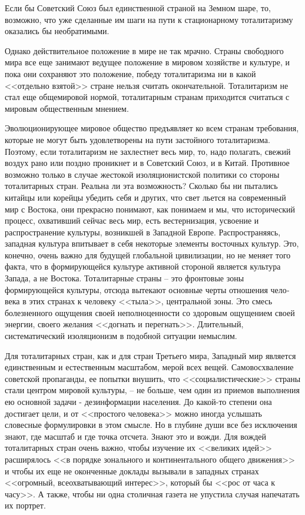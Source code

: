 \documentclass{book}
\begin{document}
Если бы Советский Союз был единственной страной на Земном шаре, то, возможно, что уже сделанные им шаги на пути к стационарному тоталитаризму оказались бы необратимыми.

Однако действительное положение в мире не так мрачно. Страны свободного мира все еще занимают ведущее положение в мировом хозяйстве и культуре, и пока они сохраняют это поло­жение, победу тоталитаризма ни в какой <<отдельно взятой>> стране нельзя считать окончательной. Тоталитаризм не стал еще общемировой нормой, тоталитарным странам приходится считаться с мировым общественным мнением.

Эволюционирующее мировое общество предъявляет ко всем странам требования, которые не могут быть удовлетво­рены на пути застойного тоталитаризма. Поэтому, если тотали­таризм не захлестнет весь мир, то, надо полагать, свежий воз­дух рано или поздно проникнет и в Советский Союз, и в Ки­тай. Противное возможно только в случае жестокой изоляци­онистской политики со стороны тоталитарных стран. Реальна ли эта возможность? Сколько бы ни пытались китайцы или ко­рейцы убедить себя и других, что свет льется на современный мир с Востока, они прекрасно понимают, как понимаем и мы, что исторический процесс, охвативший сейчас весь мир, есть вестернизация,  усвоение и распространение культуры, возник­шей в Западной Европе. Распространяясь, западная культура впитывает в себя некоторые элементы восточных культур. Это, конечно, очень важно для будущей глобальной цивили­зации, но не меняет того факта, что в формирующейся культу­ре активной стороной является культура Запада, а не Востока. Тоталитарные страны -- это фронтовые 
зоны формирующейся культуры, отсюда вытекают основные черты отношения чело­века в этих странах к человеку <<тыла>>, центральной зоны. Это смесь болезненного ощущения своей неполноценности со здо­ровым ощущением своей энергии, своего желания <<догнать и перегнать>>. Длительный, систематический изоляционизм в по­добной ситуации немыслим.

Для тоталитарных стран, как и для стран Третьего мира, Западный мир является единственным и естественным масшта­бом, мерой всех вещей. Самовосхваление советской пропаган­ды, ее попытки внушить, что <<социалистические>> страны ста­ли центром мировой культуры, -- не больше, чем один из при­емов выполнения ею основной задачи - дезинформации насе­ления. До какой-то степени она достигает цели, и от <<простого человека>> можно иногда услышать словесные формулировки в этом смысле. Но в глубине души все без исключения знают, где масштаб и где точка отсчета. Знают это и вожди. Для вож­дей тоталитарных стран очень важно, чтобы изучение их <<вели­ких идей>> расширялось <<в порядке зонального и континенталь­ного общего движения>> и чтобы их еще не оконченные докла­ды вызывали в западных странах <<огромный, всеохватываю­щий интерес>>, который бы <<рос от часа к часу>>. А также, чтобы ни одна столичная газета не упустила случая напечатать их порт­рет.
\end{document}
